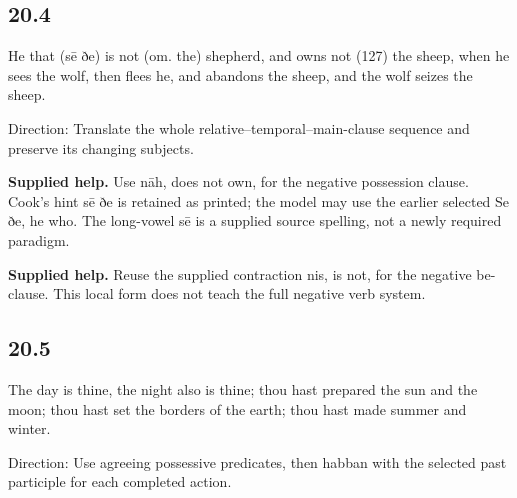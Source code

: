 \subsection*{20.4}

\par\begin{minipage}{\linewidth}\raggedright
He that (sē ðe) is not (om. the) shepherd, and owns not (127) the sheep, when he sees the wolf, then flees he, and abandons the sheep, and the wolf seizes the sheep.

Direction: Translate the whole relative–temporal–main-clause sequence and preserve its changing subjects.

\end{minipage}\par\addvspace{4pt}

\textbf{Supplied help.} Use nāh, does not own, for the negative possession clause. Cook’s hint sē ðe is retained as printed; the model may use the earlier selected Se ðe, he who. The long-vowel sē is a supplied source spelling, not a newly required paradigm.

\textbf{Supplied help.} Reuse the supplied contraction nis, is not, for the negative be-clause. This local form does not teach the full negative verb system.

\subsection*{20.5}

\par\begin{minipage}{\linewidth}\raggedright
The day is thine, the night also is thine; thou hast prepared the sun and the moon; thou hast set the borders of the earth; thou hast made summer and winter.

Direction: Use agreeing possessive predicates, then habban with the selected past participle for each completed action.

\end{minipage}\par\addvspace{4pt}

